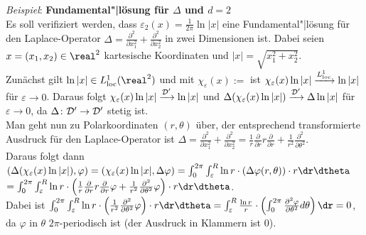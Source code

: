 \emph{Beispiel}:
\textbf{Fundamental"|lösung für $\Delta$ und $d = 2$}\\
Es soll verifiziert werden, dass $\varepsilon_2(x) = \frac{1}{2\pi} \ln |x|$
eine Fundamental"|lösung für den Laplace-Operator
$\Delta = \frac{\partial^2}{\partial x_1^2} +
\frac{\partial^2}{\partial x_2^2}$ in zwei Dimensionen ist.
Dabei seien $x = (x_1, x_2) \in \real^2$ kartesische Koordinaten und
$|x| = \sqrt{x_1^2 + x_2^2}$.\\
Zunächst gilt $\ln |x| \in L^1_\loc(\real^2)$ und mit
$\chi_\varepsilon(x) :=$  ist
$\chi_\varepsilon(x)\ln |x| \xrightarrow{L^1_{{\operatorname{loc}}}} \ln |x|$ für
$\varepsilon \to 0$.
Daraus folgt $\chi_\varepsilon(x) \ln |x| \xrightarrow{\mathcal{D}'} \ln |x|$ und
$\Delta (\chi_\varepsilon(x) \ln |x|) \xrightarrow{\mathcal{D}'} \Delta \ln |x|$
für $\varepsilon \to 0$, da $\Delta\colon \mathcal{D}' \rightarrow \mathcal{D}'$ stetig ist.\\
Man geht nun zu Polarkoordinaten $(r, \theta)$ über,
der entsprechend transformierte Ausdruck für den Laplace-Operator ist
$\Delta = \frac{\partial^2}{\partial x_1^2} +
\frac{\partial^2}{\partial x_2^2} =
\frac{1}{r} \frac{\partial}{\partial r} r \frac{\partial}{\partial r} +
\frac{1}{r^2} \frac{\partial^2}{\partial \theta^2}$.\\
Daraus folgt dann $(\Delta (\chi_\varepsilon(x)\ln |x|), \varphi) =
(\chi_\varepsilon(x)\ln |x|, \Delta \varphi) =
\int_0^{2\pi} \int_\varepsilon^R
\ln r \cdot (\Delta \varphi(r, \theta)) \cdot r\dr\dtheta$\\
$= \int_0^{2\pi} \int_\varepsilon^R
\ln r \cdot \left(\frac{1}{r} \frac{\partial}{\partial r} r
\frac{\partial}{\partial r} \varphi +
\frac{1}{r^2} \frac{\partial^2}{\partial \theta^2} \varphi\right) \cdot
r\dr\dtheta$.\\
Dabei ist $\int_0^{2\pi} \int_\varepsilon^R
\ln r \cdot
\left(\frac{1}{r^2} \frac{\partial^2}{\partial \theta^2} \varphi\right) \cdot
r\dr\dtheta =
\int_\varepsilon^R \frac{\ln r}{r} \cdot
\left(\int_0^{2\pi} \frac{\partial^2 \varphi}{\partial \theta^2}d\theta\right)
\dr = 0$,
da $\varphi$ in $\theta$ $2\pi$-periodisch ist
(der Ausdruck in Klammern ist $0$).

\pagebreak

